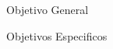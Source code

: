 \begin{frame}[t]{Objetivo General}

\end{frame}


\begin{frame}[t]{Objetivos Especificos}

\end{frame}

